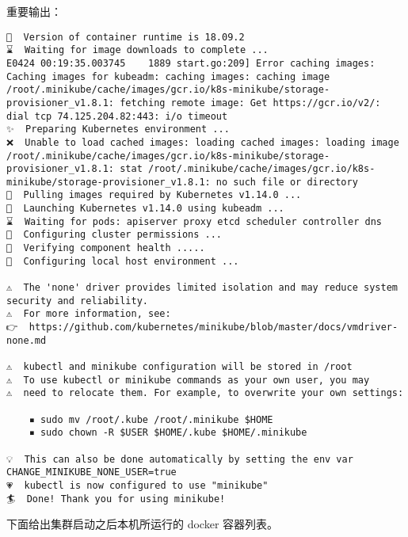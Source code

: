 重要输出：

\begin{lstlisting}
🐳  Version of container runtime is 18.09.2
⌛  Waiting for image downloads to complete ...
E0424 00:19:35.003745    1889 start.go:209] Error caching images:  Caching images for kubeadm: caching images: caching image /root/.minikube/cache/images/gcr.io/k8s-minikube/storage-provisioner_v1.8.1: fetching remote image: Get https://gcr.io/v2/: dial tcp 74.125.204.82:443: i/o timeout
✨  Preparing Kubernetes environment ...
❌  Unable to load cached images: loading cached images: loading image /root/.minikube/cache/images/gcr.io/k8s-minikube/storage-provisioner_v1.8.1: stat /root/.minikube/cache/images/gcr.io/k8s-minikube/storage-provisioner_v1.8.1: no such file or directory
🚜  Pulling images required by Kubernetes v1.14.0 ...
🚀  Launching Kubernetes v1.14.0 using kubeadm ... 
⌛  Waiting for pods: apiserver proxy etcd scheduler controller dns
🔑  Configuring cluster permissions ...
🤔  Verifying component health .....
🤹  Configuring local host environment ...

⚠️  The 'none' driver provides limited isolation and may reduce system security and reliability.
⚠️  For more information, see:
👉  https://github.com/kubernetes/minikube/blob/master/docs/vmdriver-none.md

⚠️  kubectl and minikube configuration will be stored in /root
⚠️  To use kubectl or minikube commands as your own user, you may
⚠️  need to relocate them. For example, to overwrite your own settings:

    ▪ sudo mv /root/.kube /root/.minikube $HOME
    ▪ sudo chown -R $USER $HOME/.kube $HOME/.minikube

💡  This can also be done automatically by setting the env var CHANGE_MINIKUBE_NONE_USER=true
💗  kubectl is now configured to use "minikube"
🏄  Done! Thank you for using minikube!
\end{lstlisting}

下面给出集群启动之后本机所运行的 docker 容器列表。


